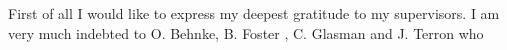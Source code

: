 First of all I would like to express my deepest gratitude to my supervisors. I am very much indebted to O. Behnke, B. Foster 
, C. Glasman and J. Terron who 